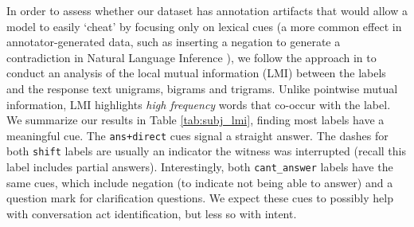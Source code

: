 In order to assess whether our dataset has annotation artifacts that would allow a model to easily `cheat' by focusing only on lexical cues (a more common effect in annotator-generated data, such as inserting a negation to generate a contradiction in Natural Language Inference \cite{Gururangan:2018}), we follow the approach in  to conduct an analysis of the local mutual information (LMI) between the labels and the response text unigrams, bigrams and trigrams. Unlike pointwise mutual information, LMI highlights \emph{high frequency} words that co-occur with the label. We summarize our results in Table \ref{tab:subj_lmi}, finding most labels have a meaningful cue. The \texttt{ans+direct} cues signal a straight answer. The dashes for both \texttt{shift} labels are usually an indicator the witness was interrupted (recall this label includes partial answers). Interestingly, both \texttt{cant\_answer} labels have the same cues, which include negation (to indicate not being able to answer) and a question mark for clarification questions. We expect these cues to possibly help with conversation act identification, but less so with intent.
